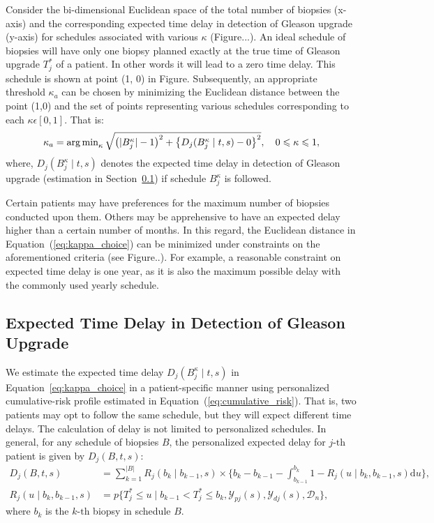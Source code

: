Consider the bi-dimensional Euclidean space of the total number of biopsies (x-axis) and the corresponding expected time delay in detection of Gleason upgrade (y-axis) for schedules associated with various $\kappa$ (Figure...). An ideal schedule of biopsies will have only one biopsy planned exactly at the true time of Gleason upgrade $T^*_j$ of a patient. In other words it will lead to a zero time delay. This schedule is shown at point (1, 0) in Figure. Subsequently, an appropriate threshold $\kappa_a$ can be chosen by minimizing the Euclidean distance between the point (1,0) and the set of points representing various schedules corresponding to each $\kappa \epsilon [0, 1]$. That is:
\begin{equation}
\label{eq:kappa_choice}
\kappa_a = \argmin_{\kappa} \sqrt{\big(\vert B_j^\kappa \vert - 1\big)^2 + \big\{D_j(B_j^{\kappa} \mid t, s) - 0\big\}^2} , \quad 0 \leq \kappa \leq 1,
\end{equation}
where, $D_j(B_j^{\kappa} \mid t, s)$ denotes the expected time delay in detection of Gleason upgrade (estimation in Section~\ref{subsec:exp_delay_estimation}) if schedule $B_j^{\kappa}$ is followed. 

Certain patients may have preferences for the maximum number of biopsies conducted upon them. Others may be apprehensive to have an expected delay higher than a certain number of months. In this regard, the Euclidean distance in Equation~(\ref{eq:kappa_choice}) can be minimized under constraints on the aforementioned criteria (see Figure..). For example, a reasonable constraint on expected time delay is one year, as it is also the maximum possible delay with the commonly used yearly schedule.

\subsection{Expected Time Delay in Detection of Gleason Upgrade}
\label{subsec:exp_delay_estimation}
We estimate the expected time delay $D_j(B_j^{\kappa} \mid t, s)$ in Equation~\ref{eq:kappa_choice} in a patient-specific manner using personalized cumulative-risk profile estimated in Equation~(\ref{eq:cumulative_risk}). That is, two patients may opt to follow the same schedule, but they will expect different time delays. The calculation of delay is not limited to personalized schedules. In general, for any schedule of biopsies $B$, the personalized expected delay for ${j\mbox{-th}}$ patient is given by $D_j(B, t, s)$:
\begin{equation}
\label{eq:expected_delay}
\begin{split}
D_j(B, t, s) &= \sum_{k=1}^{\vert B \vert} R_j(b_k \mid b_{k-1}, s) \times \Big\{b_k - b_{k-1} - \int_{b_{k-1}}^{b_k} 1 - R_j(u \mid b_k, b_{k-1}, s) \mathrm{d}u \Big\},\\
R_j(u \mid b_k, b_{k-1}, s) &= p\Big\{T^*_j \leq u \mid b_{k-1} < T^*_j \leq b_k, \mathcal{Y}_{pj}(s), \mathcal{Y}_{dj}(s), \mathcal{D}_n\Big\},
\end{split}
\end{equation}
where $b_k$ is the ${k\mbox{-th}}$ biopsy in schedule $B$. 

